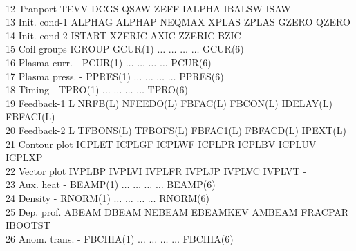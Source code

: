 \begin{tabbing}
\\
\tiny 12 \> \tiny Tranport \> \tiny TEVV \>\tiny DCGS \>\tiny QSAW
\>\tiny ZEFF \>\tiny IALPHA \>\tiny IBALSW \>\tiny ISAW  \\
\tiny 13 \> \tiny Init. cond-1 \> \tiny ALPHAG \>\tiny ALPHAP
\>\tiny NEQMAX \>\tiny XPLAS \>\tiny ZPLAS \>\tiny GZERO
\>\tiny QZERO \\
\tiny 14 \> \tiny Init. cond-2 \> \tiny ISTART \>\tiny XZERIC \>\tiny
AXIC \>\tiny ZZERIC \>\tiny BZIC \\
\tiny 15 \> \tiny Coil groups \> \tiny IGROUP \>\tiny GCUR(1)  \> $\ldots$
\> $\ldots$ \> $\ldots$ \> $\ldots$ \>\tiny GCUR(6)\\
\tiny 16 \>\tiny Plasma curr. \> \tiny  -  \>\tiny PCUR(1)  \> $\ldots$ \>
$\ldots$ \> $\ldots$  \> $\ldots$ \>\tiny PCUR(6)\\
\tiny 17 \> \tiny Plasma press. \> \tiny  -  \>\tiny PPRES(1)  \>\tiny
$\ldots$ \> $\ldots$ \> $\ldots$  \> $\ldots$ \>\tiny PPRES(6)\\
\tiny 18 \> \tiny Timing \> \tiny  -  \>\tiny TPRO(1)  \> $\ldots$ \> $\ldots$
\> $\ldots$  \> $\ldots$ \> \tiny TPRO(6)\\
\tiny 19 \> \tiny Feedback-1 \> \tiny  L  \>\tiny NRFB(L)  \>\tiny
NFEEDO(L) \>\tiny FBFAC(L) \>\tiny FBCON(L)  \>\tiny IDELAY(L)
\>\tiny FBFACI(L)\\
\tiny 20 \> \tiny Feedback-2 \> \tiny  L  \>\tiny TFBONS(L)  \>\tiny
TFBOFS(L) \>\tiny FBFAC1(L) \>\tiny FBFACD(L) \>\tiny IPEXT(L)\\
\tiny 21 \> \tiny Contour plot \> \tiny  ICPLET  \>\tiny ICPLGF 
\>\tiny ICPLWF \>\tiny ICPLPR \>\tiny ICPLBV \>\tiny ICPLUV
\>\tiny ICPLXP\\
\tiny 22 \> \tiny Vector plot \> \tiny  IVPLBP  \>\tiny IVPLVI  \>\tiny
IVPLFR \>\tiny IVPLJP \>\tiny IVPLVC \>\tiny IVPLVT \>\tiny -\\
\tiny 23 \> \tiny Aux. heat \> \tiny  -  \>\tiny BEAMP(1)  \> $\ldots$ \>
$\ldots$ \> $\ldots$ \> $\ldots$ \>\tiny BEAMP(6)\\
\tiny 24 \> \tiny Density \> \tiny  -  \>\tiny RNORM(1)  \> $\ldots$ \>
$\ldots$ \> $\ldots$ \> $\ldots$ \> \tiny RNORM(6)\\
\tiny 25 \> \tiny Dep. prof. \> \tiny  ABEAM  \>\tiny DBEAM  \>\tiny
NEBEAM \>\tiny EBEAMKEV \>\tiny AMBEAM  \>\tiny FRACPAR
\>\tiny IBOOTST\\
\tiny 26 \> \tiny Anom. trans. \> \tiny  - \>\tiny FBCHIA(1)  \> $\ldots$ \>
$\ldots$ \> $\ldots$ \> $\ldots$ \> \tiny FBCHIA(6)\\

\end{tabbing}
